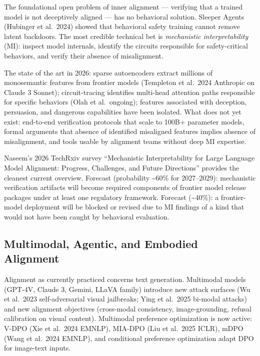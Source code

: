 \documentclass{article}
\begin{document}
The foundational open problem of inner alignment --- verifying that a trained model is not deceptively aligned --- has no behavioral solution. Sleeper Agents (Hubinger et al.~2024) showed that behavioral safety training cannot remove latent backdoors. The most credible technical bet is \emph{mechanistic interpretability} (MI): inspect model internals, identify the circuits responsible for safety-critical behaviors, and verify their absence of misalignment.

The state of the art in 2026: sparse autoencoders extract millions of monosemantic features from frontier models (Templeton et al.~2024 Anthropic on Claude 3 Sonnet); circuit-tracing identifies multi-head attention paths responsible for specific behaviors (Olah et al.~ongoing); features associated with deception, persuasion, and dangerous capabilities have been isolated. What does not yet exist: end-to-end verification protocols that scale to 100B+ parameter models, formal arguments that absence of identified misaligned features implies absence of misalignment, and tools usable by alignment teams without deep MI expertise.

Naseem's 2026 TechRxiv survey ``Mechanistic Interpretability for Large Language Model Alignment: Progress, Challenges, and Future Directions'' provides the cleanest current overview. Forecast (probability \textasciitilde60\% for 2027--2029): mechanistic verification artifacts will become required components of frontier model release packages under at least one regulatory framework. Forecast (\textasciitilde40\%): a frontier-model deployment will be blocked or revised due to MI findings of a kind that would not have been caught by behavioral evaluation.

\subsection{Multimodal, Agentic, and Embodied Alignment}\label{multimodal-agentic-and-embodied-alignment}

Alignment as currently practiced concerns text generation. Multimodal models (GPT-4V, Claude 3, Gemini, LLaVA family) introduce new attack surfaces (Wu et al.~2023 self-adversarial visual jailbreaks; Ying et al.~2025 bi-modal attacks) and new alignment objectives (cross-modal consistency, image-grounding, refusal calibration on visual content). Multimodal preference optimization is now active: V-DPO (Xie et al.~2024 EMNLP), MIA-DPO (Liu et al.~2025 ICLR), mDPO (Wang et al.~2024 EMNLP), and conditional preference optimization adapt DPO for image-text inputs.
\end{document}
